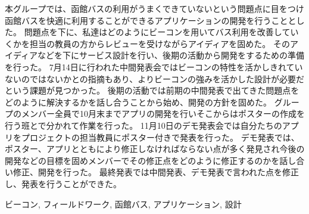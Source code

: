 \documentclass[openany,11pt,papersize]{jsbook}
\begin{document}
  \maketitle
  
  \frontmatter
  
  \begin{jabstract}
  
  
  

本グループでは、函館バスの利用がうまくできていないという問題点に目をつけ函館バスを快適に利用することができるアプリケーションの開発を行うこととした。
問題点を下に、私達はどのようにビーコンを用いてバス利用を改善していくかを担当の教員の方からレビューを受けながらアイディアを固めた。
そのアイディアなどを下にサービス設計を行い、後期の活動から開発をするための準備を行った。
7月14日に行われた中間発表会ではビーコンの特性を活かしきれていないのではないかとの指摘もあり、よりビーコンの強みを活かした設計が必要だという課題が見つかった。
後期の活動では前期の中間発表で出てきた問題点をどのように解決するかを話し合うことから始め、開発の方針を固めた。
グループのメンバー全員で10月末までアプリの開発を行いそこからはポスターの作成を行う班とで分かれて作業を行った。
11月10日のデモ発表会では自分たちのアプリをプロジェクトの担当教員にポスター付きで発表を行った。
デモ発表では、ポスター、アプリとともにより修正しなければならない点が多く発見され今後の開発などの目標を固めメンバーでその修正点をどのように修正するのかを話し合い修正、開発を行った。
最終発表では中間発表、デモ発表で言われた点を修正し、発表を行うことができた。

\begin{jkeyword}
ビーコン, フィールドワーク, 函館バス, アプリケーション, 設計
\end{jkeyword}
\end{jabstract}
\end{document}
